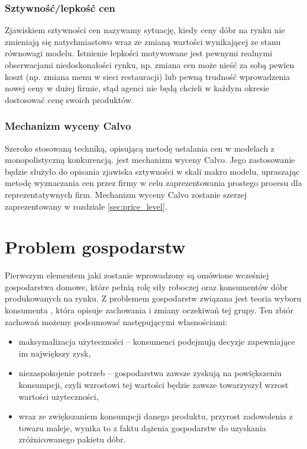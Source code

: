 \subsubsection{Sztywność/lepkość cen}

Zjawiskiem sztywności cen nazywamy sytuację, kiedy ceny dóbr na rynku nie zmieniają się natychmiastowo wraz ze zmianą wartości wynikającej ze stanu równowagi modelu. Istnienie lepkości motywowane jest pewnymi realnymi obserwacjami niedoskonałości rynku, np. zmiana cen może nieść za sobą pewien koszt (np. zmiana menu w sieci restauracji) lub pewną trudność wprowadzenia nowej ceny w dużej firmie, stąd agenci nie będą chcieli w każdym okresie dostosować cenę swoich produktów.

\subsubsection{Mechanizm wyceny Calvo}

Szeroko stosowaną techniką, opisującą metodę ustalania cen w modelach z monopolistyczną konkurencją. jest mechanizm wyceny Calvo. Jego zastosowanie będzie służyło do opisania zjawiska sztywności w skali makro modelu, upraszając metodę wyznaczania cen przez firmy w celu zaprezentowania prostego procesu dla reprezentatywnych firm. Mechanizm wyceny Calvo zostanie szerzej zaprezentowany w rozdziale \ref{sec:price_level}.

\section{Problem gospodarstw}

Pierwszym elementem jaki zostanie wprowadzony są omówione wcześniej gospodarstwa domowe, które pełnią rolę siły roboczej oraz konsumentów dóbr produkowanych na rynku. Z problemem gospodarstw związana jest teoria wyboru konsumenta \cite{duesenberry}, która opisuje zachowania i zmiany oczekiwań tej grupy. Ten zbiór zachowań możemy podsumować następującymi własnościami:
\begin{itemize}
    \item maksymalizacja użyteczności -- konsumenci podejmują decyzje zapewniające im największy zysk,
    \item niezaspokojenie potrzeb -- gospodarstwa zawsze zyskują na powiększeniu konsumpcji, czyli wzrostowi tej wartości będzie zawsze towarzyszył wzrost wartości użyteczności,
    \item wraz ze zwiększaniem konsumpcji danego produktu, przyrost zadowolenia z towaru maleje, wynika to z faktu dążenia gospodarstw do uzyskania zróżnicowanego pakietu dóbr.
\end{itemize}

